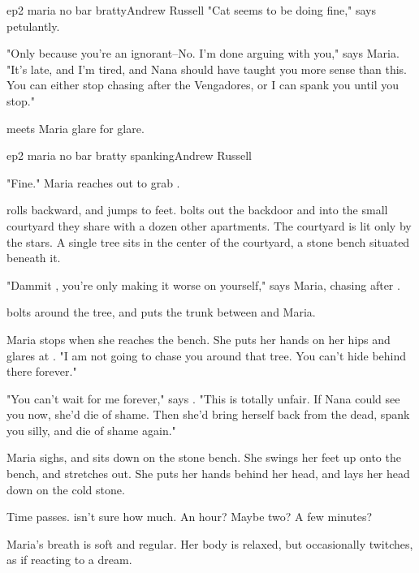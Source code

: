 \documentclass{book}
\begin{document}
\begin{childnode}{ep2 maria no bar bratty}{Andrew Russell}
    "Cat seems to be doing fine," says \name{} petulantly.

    "Only because you're an ignorant--No. I'm done arguing with you," says Maria. "It's late, and I'm tired, and Nana should have taught you more sense than this. You can either stop chasing after the Vengadores, or I can spank you until you stop."

    \name{} meets Maria glare for glare. 



\end{childnode}

\begin{childnode}{ep2 maria no bar bratty spanking}{Andrew Russell}


    "Fine." Maria reaches out to grab \name{}.

    \name{} rolls backward, and jumps to \hisher{} feet. \HeShe{} bolts out the backdoor and into the small courtyard they share with a dozen other apartments. The courtyard is lit only by the 
    stars. A single tree sits in the center of the courtyard, a stone 
    bench situated beneath it. 

    "Dammit \name{}, you're only making it worse on yourself," says Maria, chasing after \himher{}.

    \name{} bolts around the tree, and puts the trunk between \himselfherself{} and Maria.

    Maria stops when she reaches the bench. She puts her hands on her hips and glares at \name{}. "I am not going to chase you around that tree. You can't hide behind there forever."

    "You can't wait for me forever," says \name{}. "This is totally unfair. If Nana could see you now, she'd die of shame. Then she'd bring herself back from the dead, spank you silly, and
    die of shame again."

    Maria sighs, and sits down on the stone bench. She swings her feet up onto the bench, and stretches out. She puts her hands behind her head, and lays her head down on the cold stone.

    Time passes. \name{} isn't sure how much. An hour? Maybe two? A few minutes?

    Maria's breath is soft and regular. Her body is relaxed, but occasionally twitches, as if reacting to a dream.


\end{childnode}
\end{document}
